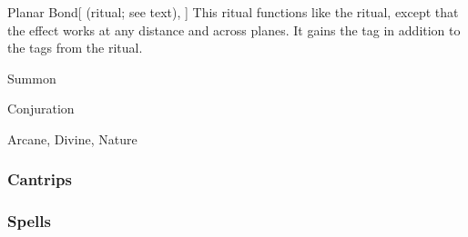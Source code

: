 \lowercase{\hypertarget{spell:Planar Bond}{}}\label{spell:Planar Bond}
\begin{attuneability}[\nth{7}]{\hypertarget{spell:Planar Bond}{Planar Bond}}[ (ritual; see text), ]
This ritual functions like the  ritual, except that the effect works at any distance and across planes.
It gains the  tag in addition to the tags from the  ritual.
\end{attuneability}
\vspace{0.25em}


\newpage
\begin{spellsection}{Summon}

\begin{spellheader}
\end{spellheader}


 Conjuration

 Arcane, Divine, Nature

\subsubsection{Cantrips}


\end{spellsection}


\subsubsection{Spells}


